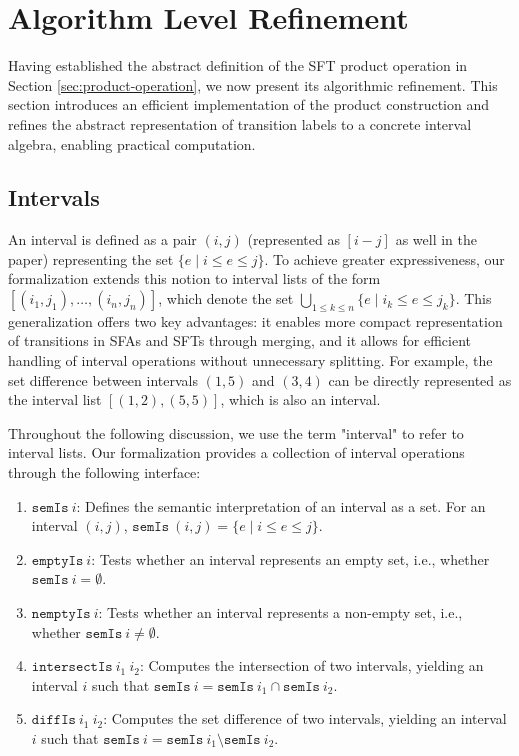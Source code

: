 \documentclass[a4paper,UKenglish,cleveref, autoref, thm-restate]{lipics-v2021}
\begin{document}
\section{Algorithm Level Refinement}
\label{sec_alg_refinement}
Having established the abstract definition of the SFT product operation in Section \ref{sec:product-operation}, we now present its algorithmic refinement. This section introduces an efficient implementation of the product construction and refines the abstract representation of transition labels to a concrete interval algebra, enabling practical computation.


\subsection{Intervals}

An interval is defined as a pair $(i, j)$ (represented as $[i-j]$ as well in the paper) representing the set $\{e \mid i \leq e \leq j\}$. To achieve greater expressiveness, our formalization extends this notion to interval lists of the form $[(i_1, j_1), \ldots, (i_n, j_n)]$, which denote the set $\bigcup_{1\leq k\leq n}\{e \mid i_k \leq e \leq j_k\}$. This generalization offers two key advantages: it enables more compact representation of transitions in SFAs and SFTs through merging, and it allows for efficient handling of interval operations without unnecessary splitting. For example, the set difference between intervals $(1, 5)$ and $(3, 4)$ can be directly represented as the interval list $[(1, 2), (5, 5)]$, which is also an interval.


Throughout the following discussion, we use the term "interval" to refer to interval lists. Our formalization provides a collection of interval operations through the following interface:

\begin{enumerate}
  \item $\texttt{semIs}~i$: Defines the semantic interpretation of an interval as a set. For an interval $(i,j)$, $\texttt{semIs}~(i,j) = \{e \mid i \leq e \leq j\}$.
  \item $\texttt{emptyIs}~i$: Tests whether an interval represents an empty set, i.e., whether $\texttt{semIs}~i = \emptyset$.
  \item $\texttt{nemptyIs}~i$: Tests whether an interval represents a non-empty set, i.e., whether $\texttt{semIs}~i \neq \emptyset$.
  \item $\texttt{intersectIs}~i_1~i_2$: Computes the intersection of two intervals, yielding an interval $i$ such that $\texttt{semIs}~i = \texttt{semIs}~i_1 \cap \texttt{semIs}~i_2$.
  \item $\texttt{diffIs}~i_1~i_2$: Computes the set difference of two intervals, yielding an interval $i$ such that $\texttt{semIs}~i = \texttt{semIs}~i_1 \setminus \texttt{semIs}~i_2$.
\end{enumerate}
\end{document}
